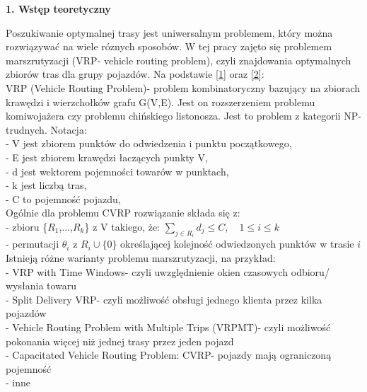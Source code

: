 \documentclass[a4paper, twoside, 12pt, justified]{article}
\begin{document}
		
	\begin{large}\textbf{1. Wstęp teoretyczny}\end{large}
	\vspace{10mm} %
	
	\hspace{5mm}
	Poszukiwanie optymalnej trasy jest uniwersalnym problemem, który można rozwiązywać na wiele róznych sposobów. W tej pracy zajęto się problemem marszrutyzacji (VRP- vehicle routing problem), czyli znajdowania optymalnych zbiorów tras dla grupy pojazdów. Na podstawie \hyperlink{vrp}{[1]} oraz \hyperlink{cvrp}{[2]}:\\
	VRP (Vehicle Routing Problem)- problem kombinatoryczny bazujący na zbiorach krawędzi i wierzchołków grafu G(V,E). Jest on rozszerzeniem problemu komiwojażera czy problemu chińskiego listonosza. Jest to problem z kategorii NP- trudnych. Notacja: \\
	- V jest zbiorem punktów do odwiedzenia i punktu początkowego,\\
	- E jest zbiorem krawędzi łaczących punkty V,\\
	- d jest wektorem pojemności towarów w punktach,\\
	- k jest liczbą tras,\\
	- C to pojemność pojazdu,\\
	
	Ogólnie dla problemu CVRP rozwiązanie składa się z:\\
	- zbioru \{$R_{1}$,...,$R_{k}$\} z V takiego, że:  $\sum_{j \in R_i} d_j \leq C, \quad 1 \leq i \leq k$ \\
	- permutacji $\theta_i$ z $R_i \cup \{0\}$ określającej kolejność odwiedzonych punktów w trasie $i$\\
	
	Istnieją różne warianty problemu marszrutyzacji, na przykład:\\ 
	- VRP with Time Windows- czyli uwzględnienie okien czasowych odbioru/ wysłania towaru\\
	- Split Delivery VRP- czyli możliwość obsługi jednego klienta przez kilka pojazdów\\
	- Vehicle Routing Problem with Multiple Trips (VRPMT)- czyli możliwość pokonania więcej niż jednej trasy przez jeden pojazd\\
	- Capacitated Vehicle Routing Problem: CVRP- pojazdy mają ograniczoną pojemność\\ 
	- inne
\end{document}
